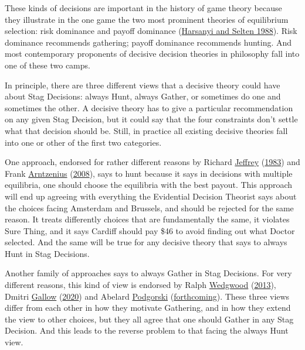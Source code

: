 \documentclass[
  12pt,
]{article}
\begin{document}
These kinds of decisions are important in the history of game theory
because they illustrate in the one game the two most prominent theories
of equilibrium selection: risk dominance and payoff dominance
(\protect\hyperlink{ref-HarsanyiSelten1988}{Harsanyi and Selten 1988}).
Risk dominance recommends gathering; payoff dominance recommends
hunting. And most contemporary proponents of decisive decision theories
in philosophy fall into one of these two camps.

In principle, there are three different views that a decisive theory
could have about Stag Decisions: always Hunt, always Gather, or
sometimes do one and sometimes the other. A decisive theory has to give
a particular recommendation on any given Stag Decision, but it could say
that the four constraints don't settle what that decision should be.
Still, in practice all existing decisive theories fall into one or other
of the first two categories.

One approach, endorsed for rather different reasons by Richard
\protect\hyperlink{ref-Jeffrey1983}{Jeffrey}
(\protect\hyperlink{ref-Jeffrey1983}{1983}) and Frank
\protect\hyperlink{ref-Arntzenius2008}{Arntzenius}
(\protect\hyperlink{ref-Arntzenius2008}{2008}), says to hunt because it
says in decisions with multiple equilibria, one should choose the
equilibria with the best payout. This approach will end up agreeing with
everything the Evidential Decision Theorist says about the choices
facing Amsterdam and Brussels, and should be rejected for the same
reason. It treats differently choices that are fundamentally the same,
it violates Sure Thing, and it says Cardiff should pay \$46 to avoid
finding out what Doctor selected. And the same will be true for any
decisive theory that says to always Hunt in Stag Decisions.

Another family of approaches says to always Gather in Stag Decisions.
For very different reasons, this kind of view is endorsed by Ralph
\protect\hyperlink{ref-Wedgwood2013}{Wedgwood}
(\protect\hyperlink{ref-Wedgwood2013}{2013}), Dmitri
\protect\hyperlink{ref-Gallow2020}{Gallow}
(\protect\hyperlink{ref-Gallow2020}{2020}) and Abelard
\protect\hyperlink{ref-Podgorski2022}{Podgorski}
(\protect\hyperlink{ref-Podgorski2022}{forthcoming}). These three views
differ from each other in how they motivate Gathering, and in how they
extend the view to other choices, but they all agree that one should
Gather in any Stag Decision. And this leads to the reverse problem to
that facing the always Hunt view.
\end{document}
